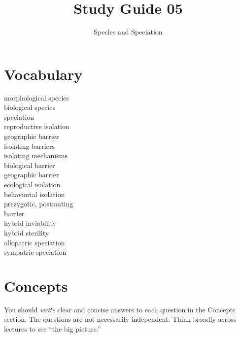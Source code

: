 \documentclass[letterpaper]{tufte-handout}
\title{Study Guide 05\hfill}
\author{Species and Speciation}
\date{} %
\begin{document}
\maketitle	%


\section{Vocabulary}
\vspace{-1\baselineskip}
\begin{multicols}{2}
morphological species\\
biological species\\
speciation\\
reproductive isolation\\
geographic barrier\\
isolating barriers\\
isolating mechanisms\\
biological barrier\\
geographic barrier\\
ecological isolation\\
behaviorial isolation\\
prezygotic, postmating\\\hspace{1em}barrier\\
hybrid inviability\\
hybrid sterility\\
allopatric speciation\\
sympatric speciation\\
\end{multicols}

\section{Concepts}

You should \emph{write} clear and concise answers to each question in the Concepts section.  The questions are not necessarily independent.  Think broadly across lectures to see ``the big picture.'' 
\end{document}
